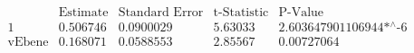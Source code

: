 \[\begin{array}{l|llll}
 \text{} & \text{Estimate} & \text{Standard Error} & \text{t-Statistic} & \text{P-Value} \\
\hline
 1 & 0.506746 & 0.0900029 & 5.63033 & \text{2.603647901106944$\grave{ }$*${}^{\wedge}$-6} \\
 \text{vEbene} & 0.168071 & 0.0588553 & 2.85567 & 0.00727064 \\
\end{array}\]

